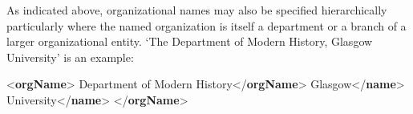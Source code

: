 As indicated above, organizational names may also be specified hierarchically particularly where the named organization is itself a department or a branch of a larger organizational entity. ‘The Department of Modern History, Glasgow University’ is an example: \par\bgroup{}\exampleFont \begin{shaded}\noindent\mbox{}{<\textbf{orgName}>}\mbox{}\newline 
{}Department of Modern History{</\textbf{orgName}>}\mbox{}\newline 
{}\mbox{}\newline 
\hspace*{1em}Glasgow{</\textbf{name}>}\mbox{}\newline 
\hspace*{1em}University{</\textbf{name}>}\mbox{}\newline 
{}\mbox{}\newline 
{</\textbf{orgName}>}\end{shaded}\egroup\par \par

